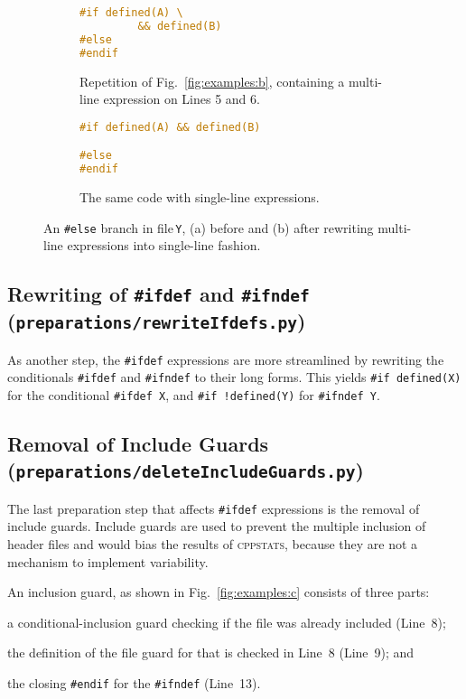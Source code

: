 \documentclass[a4paper]{scrartcl}
\newcommand\code[1]{\texttt{#1}}
\newcommand\tool[1]{\textsc{#1}}
\newcommand\ifdeff[1]{\code{\##1}\xspace}
\newcommand\ifdef[0]{{\upshape\ifdeff{ifdef}}\xspace}
\newcommand\cppstats[0]{\tool{cppstats}\xspace}
\begin{document}
\begin{figure}[ht]
  \centering
  \begin{subfigure}[b]{0.45\textwidth}
		\begin{lstlisting}[language=C, firstnumber=5]
#if defined(A) \
		 && defined(B)
#else 
#endif
		\end{lstlisting}
		\caption{Repetition of Fig.\ \ref{fig:examples:b}, containing a multi-line expression on Lines 5 and 6.}
		\label{fig:multiline:a}
  \end{subfigure}
  \hfill
  \begin{subfigure}[b]{0.45\textwidth}
		\begin{lstlisting}[language=C, firstnumber=5]
#if defined(A) && defined(B)

#else 
#endif
		\end{lstlisting}
		\caption{The same code with single-line expressions.}
		\label{fig:multiline:b}
  \end{subfigure}
  
  \caption{An \ifdeff{else} branch in file\,\code{Y}, (a) before and (b) after rewriting multi-line expressions into single-line fashion.}
  
\end{figure}


\subsection{Rewriting of \ifdeff{ifdef} and \ifdeff{ifndef} {\footnotesize (\code{preparations/rewriteIfdefs.py})}}

As another step, the \ifdef expressions are more streamlined by rewriting the conditionals \ifdeff{ifdef} and \ifdeff{ifndef} to their long forms.
This yields \ifdeff{if defined(X)} for the conditional \ifdeff{ifdef X}, and \ifdeff{if\,!defined(Y)} for \ifdeff{ifndef Y}.


\subsection{Removal of Include Guards {\footnotesize (\code{preparations/deleteIncludeGuards.py})}}

The last preparation step that affects \ifdef expressions is the removal of include guards.
Include guards are used to prevent the multiple inclusion of header files and would bias the results of \cppstats, because they are not a mechanism to implement variability.

An inclusion guard, as shown in Fig.\ \ref{fig:examples:c} consists of three parts:
\begin{inparaenum}[\itshape 1\upshape)]
\item a conditional-inclusion guard checking if the file was already included (Line~8);
\item the definition of the file guard for that is checked in Line~8 (Line~9); and
\item the closing \ifdeff{endif} for the \ifdeff{ifndef} (Line~13).
\end{inparaenum}
\end{document}
